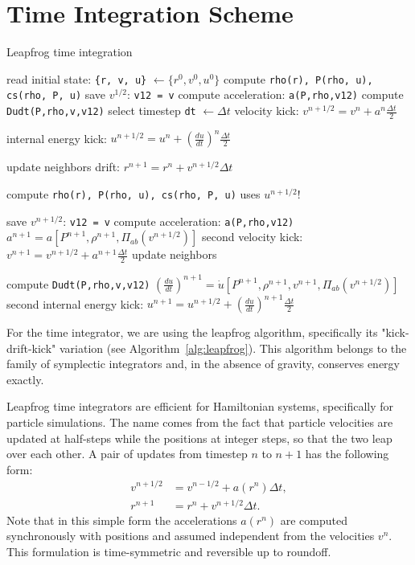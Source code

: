 \documentclass[notes.tex]{subfiles}
\begin{document}
\section{Time Integration Scheme}

\begin{algorithm}
\caption{Leapfrog time integration}
\label{alg:leapfrog}
\begin{algorithmic}[1]
\State read initial state: {\tt \{r, v, u\}} $\leftarrow \{r^0, v^0, u^0\}$
\State compute {\tt rho(r), P(rho, u), cs(rho, P, u)} 
\State save $v^{1/2}$: {\tt v12 = v}
\State compute acceleration: {\tt a(P,rho,v12)} 
\State compute {\tt Dudt(P,rho,v,v12)} 
\State select timestep {\tt dt} $\leftarrow\Delta t$
\Comment velocity kick: $v^{n+1/2} = v^{n} + a^{n}\frac{\Delta t}2$

\Comment internal energy kick:
         $u^{n+1/2} = u^{n} + \left(\frac{du}{dt}\right)^{n}\frac{\Delta t}2$

\State update neighbors
\Comment drift: $r^{n+1} = r^{n} + v^{n+1/2}\Delta t$

\State compute {\tt rho(r), P(rho, u), cs(rho, P, u)} 
\Comment uses $u^{n+1/2}$!

\State save $v^{n+1/2}$: {\tt v12 = v}
\State compute acceleration: {\tt a(P,rho,v12)} 
\Comment $a^{n+1} = a[P^{n+1},\rho^{n+1},\Pi_{ab}(v^{n+1/2})]$
\Comment second velocity kick: $v^{n+1} = v^{n+1/2} + a^{n+1}\frac{\Delta t}2$
\State update neighbors

\State compute {\tt Dudt(P,rho,v,v12)} 
\Comment $\left(\frac{du}{dt}\right)^{n+1} 
          = \dot{u}[P^{n+1},\rho^{n+1},v^{n+1},\Pi_{ab}(v^{n+1/2})]$
\Comment second internal energy kick:
         $u^{n+1} = u^{n+1/2} + \left(\frac{du}{dt}\right)^{n+1}\frac{\Delta t}2$
\EndWhile
\end{algorithmic}
\end{algorithm}

For the time integrator, we are using the leapfrog algorithm, specifically its
"kick-drift-kick" variation (see Algorithm~\ref{alg:leapfrog}). This algorithm
belongs to the family of symplectic integrators and, in the absence of
gravity, conserves energy exactly.

Leapfrog time integrators are efficient for Hamiltonian systems, specifically
for particle simulations. The name comes from the fact that particle
velocities are updated at half-steps while the positions at integer steps, so
that the two leap over each other. A pair of updates from timestep $n$ to
$n+1$ has the following form:
\begin{align}
v^{n+1/2} &= v^{n-1/2} + a(r^{n}) \Delta t, \\
r^{n+1}   &= r^n + v^{n+1/2} \Delta t.
\end{align}
Note that in this simple form the accelerations $a(r^n)$ are computed
synchronously with positions and assumed independent from the velocities $v^n$.
This formulation is time-symmetric and reversible up to roundoff.
\end{document}

